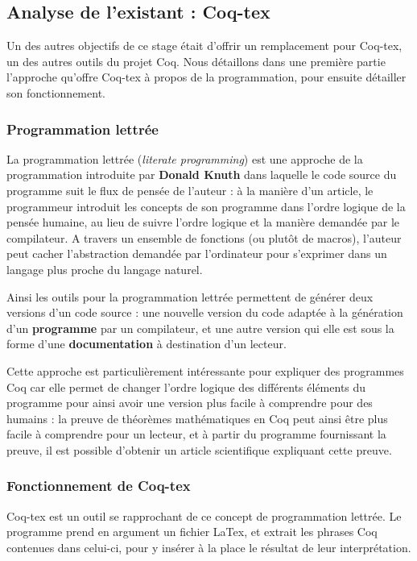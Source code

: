 \documentclass[a4paper, 11pt]{report}
\begin{document}
    \subsection{Analyse de l'existant : Coq-tex}
    Un des autres objectifs de ce stage était d'offrir un remplacement pour
    Coq-tex, un des autres outils du projet Coq. Nous détaillons dans une
    première partie l'approche qu'offre Coq-tex à propos de la programmation,
    pour ensuite détailler son fonctionnement.

    \subsubsection{Programmation lettrée}
    La programmation lettrée (\textit{literate programming}) est une approche
    de la programmation introduite par \textbf{Donald Knuth} dans laquelle
    le code source du programme suit le flux de pensée de l'auteur : à la
    manière d'un article, le programmeur introduit les concepts de son
    programme dans l'ordre logique de la pensée humaine, au lieu de suivre
    l'ordre logique et la manière demandée par le compilateur. A travers un
    ensemble de fonctions (ou plutôt de macros), l'auteur peut cacher
    l'abstraction demandée par l'ordinateur pour s'exprimer dans un langage
    plus proche du langage naturel.

    Ainsi les outils pour la programmation lettrée permettent de générer deux
    versions d'un code source : une nouvelle version du code adaptée à la
    génération d'un \textbf{programme} par un compilateur, et une autre version
    qui elle est sous la forme d'une \textbf{documentation} à destination d'un
    lecteur.

    Cette approche est particulièrement intéressante pour expliquer des
    programmes Coq car elle permet de changer l'ordre logique des différents
    éléments du programme pour ainsi avoir une version plus facile à comprendre
    pour des humains : la preuve de théorèmes mathématiques en Coq peut ainsi
    être plus facile à comprendre pour un lecteur, et à partir du programme
    fournissant la preuve, il est possible d'obtenir un article scientifique
    expliquant cette preuve.

    \subsubsection{Fonctionnement de Coq-tex}
    Coq-tex est un outil se rapprochant de ce concept de programmation lettrée.
    Le programme prend en argument un fichier LaTex, et extrait les phrases
    Coq contenues dans celui-ci, pour y insérer à la place le résultat de
    leur interprétation.
\end{document}
